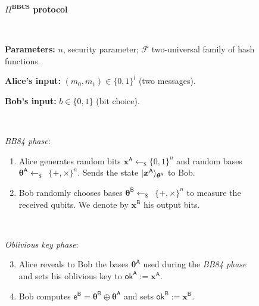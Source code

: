 \begin{figure}[h!]
    \centering
        \begin{tcolorbox}
            
            \centerline{$\Pi^{\textbf{BBCS}}$ \textbf{protocol}}
            
            \
            
            \textbf{Parameters:} $n$, security parameter; $\mathcal{F}$ two-universal family of hash functions.
            
            \textbf{Alice's input:} $(m_0, m_1)\in\{0,1\}^l$ (two messages). 
            
            \textbf{Bob's input:} $b\in\{0,1\}$ (bit choice).
            
            \
            
            \textit{BB84 phase}:
            \begin{enumerate}
                \item Alice generates random bits $\bm{x}^{\mathsf{A}}\leftarrow_{\$}\{0,1\}^n$ and random bases $\bm{\theta}^{\mathsf{A}}\leftarrow_{\$}$~$\{+,\times\}^n$. Sends the state $| \bm{x}^{\mathsf{A}} \rangle_{\bm{\theta}^{\mathsf{A}}}$ to Bob.
                \item Bob randomly chooses bases $\bm{\theta}^{\mathsf{B}}\leftarrow_{\$}$~$\{+,\times\}^n$ to measure the received qubits. We denote by $\bm{x}^{\mathsf{B}}$ his output bits.
            \end{enumerate}
            
            \
            
            \textit{Oblivious key phase}:
            \begin{enumerate}
            \setcounter{enumi}{2}
                \item Alice reveals to Bob the bases $\bm{\theta}^{\mathsf{A}}$ used during the \textit{BB84 phase} and sets his oblivious key to $\mathsf{ok}^{\mathsf{A}}:=\bm{x}^{\mathsf{A}}$.
                \item Bob computes $\mathsf{e}^\mathsf{B} = \bm{\theta}^{\mathsf{B}} \oplus \bm{\theta}^{\mathsf{A}}$ and sets $\mathsf{ok}^{\mathsf{B}}:=\bm{x}^{\mathsf{B}}$.
            \end{enumerate}
            
            \
            

\end{tcolorbox}
\end{figure}

